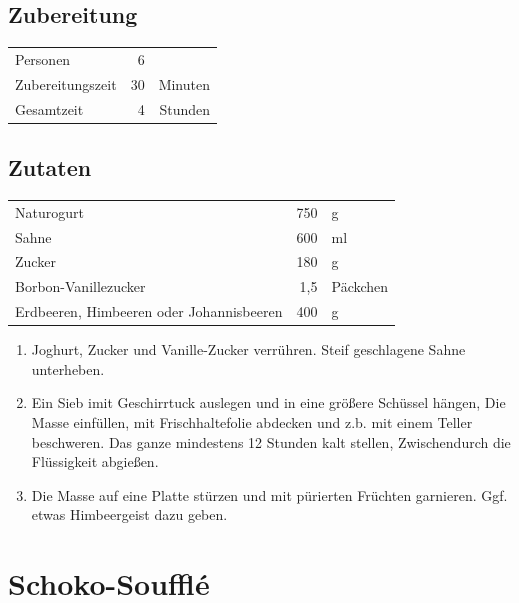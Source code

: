 \subsection*{Zubereitung}
\begin{tabular}{lrr}
Personen         &                        6 &  \\
Zubereitungszeit &                       30 & Minuten \\
Gesamtzeit       &                        4 & Stunden \\
\end{tabular} 

\subsection*{Zutaten}
\begin{tabular}{lrl}
	Naturogurt                               & 750 & g        \\
	Sahne                                    & 600 & ml       \\
	Zucker                                   & 180 & g        \\
	Borbon-Vanillezucker                     & 1,5 & Päckchen \\
	Erdbeeren, Himbeeren oder Johannisbeeren & 400 & g
\end{tabular} 


\begin{enumerate}
\item Joghurt, Zucker und Vanille-Zucker verrühren. Steif geschlagene Sahne unterheben.
\item Ein Sieb imit Geschirrtuck auslegen und in eine größere Schüssel hängen, Die Masse einfüllen, mit Frischhaltefolie abdecken und z.b. mit einem Teller beschweren. Das ganze mindestens 12 Stunden kalt stellen, Zwischendurch die Flüssigkeit abgießen. 
\item Die Masse auf eine Platte stürzen und mit pürierten Früchten garnieren. Ggf. etwas Himbeergeist dazu geben.
\end{enumerate}

\section{Schoko-Soufflé}%

%


